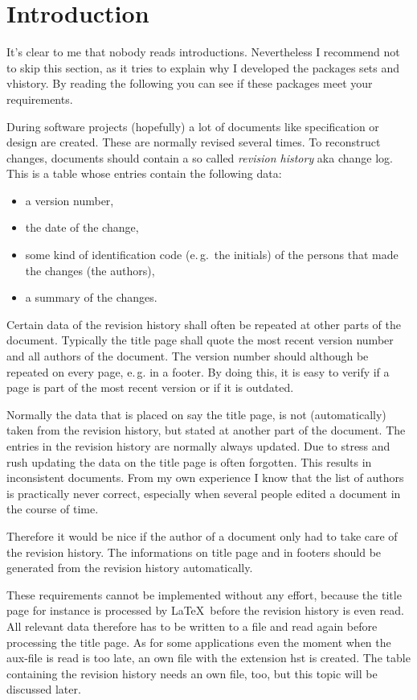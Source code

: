 \section{Introduction}\label{introduction}
It's clear to me that nobody reads introductions. Nevertheless I recommend not to skip this section, as it tries to explain why I developed the packages sets and vhistory.
By reading the following you can see if these packages meet your requirements.

During software projects (hopefully) a lot of documents like specification or design are created. These are normally revised several times. To reconstruct changes, documents should contain a so called \emph{revision history} aka change log. This is a table whose entries contain the following data:
\begin{itemize}
	\item a version number,
	\item the date of the change,
	\item some kind of identification code (e.\,g.\ the initials) of the persons that
	made the changes (the authors),
	\item a summary of the changes.
\end{itemize}

Certain data of the revision history shall often be repeated at other parts of the document. Typically the title page shall quote the most recent version number and all authors of the document. The version number should although be repeated on every page, e.\,g. in a footer. By doing this, it is easy to verify if a page is part of the most recent version or if it is outdated.

Normally the data that is placed on say the title page, is not (automatically) taken from the revision history, but stated at another part of the document. The entries in the revision history are normally always updated. Due to stress and rush updating the data on the title page is often forgotten. This results in inconsistent documents.
From my own experience I know that the list of authors is practically never correct, especially when several people edited a document in the course of time.

Therefore it would be nice if the author of a document only had to take care of the revision history. The informations on title page and in footers should be generated from the revision history automatically.

These requirements cannot be implemented without any effort, because the title page for instance is processed by \LaTeX\ before the revision history is even read. 
All relevant data therefore has to be written to a file and read again before processing the title page. As for some applications even the moment when the aux-file is read is too late, an own file with the extension hst is created.
The table containing the revision history needs an own file, too, but this topic will be discussed later.


